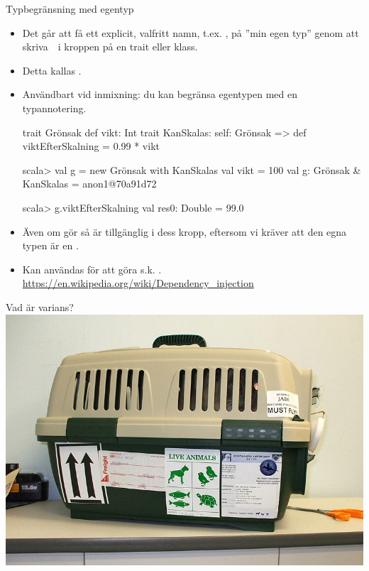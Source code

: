 \begin{Slide}{Typbegränsning med egentyp }\SlideFontSmall
\begin{itemize}\SlideFontTiny
  \item Det går att få ett explicit, valfritt namn, t.ex. ,  på ''min egen typ'' genom att skriva~~i kroppen på en trait eller klass. 
  \item Detta kallas  . 
  \item Användbart vid inmixning: du kan begränsa egentypen med en typannotering.
\begin{Code}
trait Grönsak { def vikt: Int }
trait KanSkalas:
  self: Grönsak =>
  def viktEfterSkalning = 0.99 * vikt 
\end{Code}
\begin{REPLsmall}
scala> val g = new Grönsak with KanSkalas { val vikt = 100 }
val g: Grönsak & KanSkalas = anon1@70a91d72
                                                                                    
scala> g.viktEfterSkalning
val res0: Double = 99.0
\end{REPLsmall}
\item Även om   gör  så är   tillgänglig i dess kropp, eftersom vi kräver att den egna typen är en .
\item Kan användas för att göra s.k.  .\\\url{https://en.wikipedia.org/wiki/Dependency_injection}
\end{itemize}

\end{Slide}




\ifkompendium\else
\begin{SlideSimple}{Vad är varians?}
\hspace*{-2cm}\includegraphics[width=1.4\textwidth]{../img/pet-carrier.jpg}  
\end{SlideSimple}
\fi 

